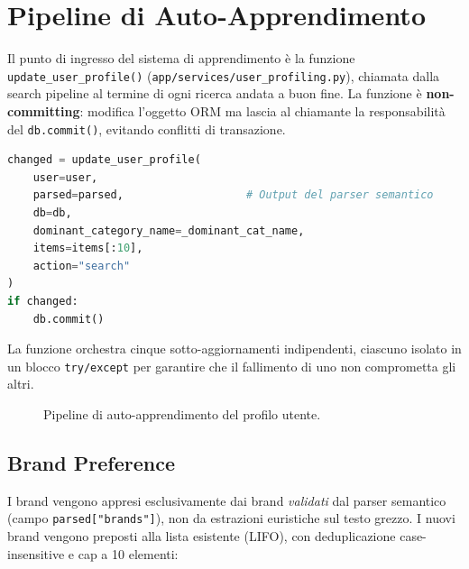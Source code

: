 \section{Pipeline di Auto-Apprendimento}
\label{sec:auto-learning}

Il punto di ingresso del sistema di apprendimento è la funzione
\texttt{update\_user\_profile()} (\texttt{app/services/user\_profiling.py}),
chiamata dalla search pipeline al termine di ogni ricerca andata a buon
fine. La funzione è \textbf{non-committing}: modifica l'oggetto ORM ma
lascia al chiamante la responsabilità del \texttt{db.commit()}, evitando
conflitti di transazione.

\begin{lstlisting}[language=Python,caption={Chiamata a update\_user\_profile() dalla search pipeline (app/services/search\_pipeline.py)},label=lst:auto-learn-trigger]
changed = update_user_profile(
    user=user,
    parsed=parsed,                   # Output del parser semantico
    db=db,
    dominant_category_name=_dominant_cat_name,
    items=items[:10],
    action="search"
)
if changed:
    db.commit()
\end{lstlisting}

La funzione orchestra cinque sotto-aggiornamenti indipendenti, ciascuno
isolato in un blocco \texttt{try/except} per garantire che il fallimento
di uno non comprometta gli altri.

\begin{figure}[htbp]
    \centering
    \caption{Pipeline di auto-apprendimento del profilo utente.}
    \label{fig:profiling-pipeline}
\end{figure}

\subsection{Brand Preference}
\label{subsec:brand-learning}

I brand vengono appresi esclusivamente dai brand \emph{validati} dal
parser semantico (campo \texttt{parsed["brands"]}), non da estrazioni
euristiche sul testo grezzo. I nuovi brand vengono preposti alla lista
esistente (LIFO), con deduplicazione case-insensitive e cap a 10 elementi:

